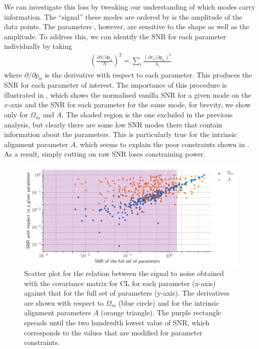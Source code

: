 \documentclass[twocolumn]{\docclass}
\newcommand\be{\begin{equation}}
\newcommand\ee{\end{equation}}
\def\bea{\begin{eqnarray}}
\def\eea{\end{eqnarray}}
\begin{document}
	We can investigate this loss by tweaking our understanding of which modes carry information. The ``signal'' these modes are ordered by is the amplitude of the data points.  The parameters , however, are sensitive to the shape as well as the amplitude.
	To address this, we can identify the SNR for each parameter individually by taking
	\bea
	\left(\frac{\partial S/\partial p_\alpha}{N}\right)^2 = \sum_{i} \frac{(\partial v_i / \partial p_\alpha)^2}{\lambda_i}
	\eea
	where $\partial /\partial p_\alpha$ is the derivative with respect to each parameter. This produces the SNR for each parameter of interest. The importance of this procedure is illustrated in , which shows the normalised vanilla SNR for a given mode on the $x$-axis and the SNR for each parameter for the same mode, for brevity, we show only for $\Omega_m$ and $A$. The shaded region is the one excluded in the previous analysis, but clearly there are some low SNR modes there that contain information about the parameters. This is particularly true for the intrinsic alignment parameter $A$, which seems to explain the poor constraints shown in . As a result, simply cutting on raw SNR loses constraining power.
	
	\begin{figure}
		\includegraphics[width=1\columnwidth]{SNR/SNR_200_omA.pdf}
		\caption{Scatter plot for the relation between the signal to noise obtained with the covariance matrix for CL for each parameter (x-axis) against that for the full set of parameters (y-axis). The derivatives are shown with respect to $\Omega_m$ (blue circle) and for the intrinsic alignment parameters $A$ (orange triangle). The purple rectangle spreads until the two hundredth lowest value of SNR, which corresponds to the values that are modified for parameter constraints. \label{fig:signalnoise_cuts}}
	\end{figure}
	
\end{document}
